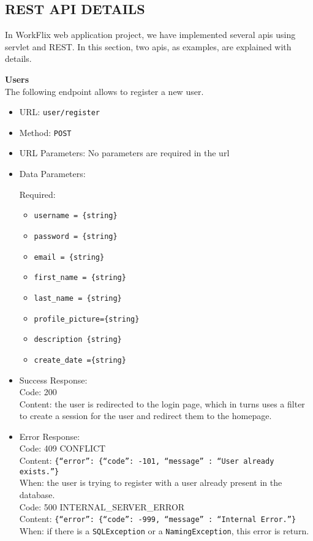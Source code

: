 \subsection{REST API DETAILS}

In WorkFlix web application project, we have implemented several apis using servlet and REST. In this section, two apis, as examples, are explained with details.


\noindent\textbf{Users}\\
The following endpoint allows to register a new user.

\begin{itemize}
    \item URL: \texttt{user/register}
    \item Method: \texttt{POST}
    \item URL Parameters: No parameters are required in the url
    \item Data Parameters:
    
    Required:
    
    \begin{itemize}
        \item \texttt{username = \{string\}}
        \item \texttt{password = \{string\}}
        \item \texttt{email = \{string\}}
        \item \texttt{first\_name = \{string\}}
        \item \texttt{last\_name = \{string\}}
        \item \texttt{profile\_picture=\{string\}}
        \item \texttt{description \{string\}}
        \item \texttt{create\_date =\{string\}}
    \end{itemize}
    
    
    \item Success Response:\\
    
    Code: 200\\
    Content: the user is redirected to the login page, which in turns uses a filter to create a session for the user and redirect them to the homepage.\\

    \item Error Response:\\
    
    Code: 409 CONFLICT\\
    Content: \texttt{\{``error'': \{``code'': -101, ``message'' : ``User already exists.''\}}\\
    When: the user is trying to register with a user already present in the database.\\

    Code: 500 INTERNAL\_SERVER\_ERROR\\
    Content: \texttt{\{``error'': \{``code'': -999, ``message'' : ``Internal Error.''\}}\\
    When: if there is a \texttt{SQLException} or a \texttt{NamingException}, this error is return.\\
    
\end{itemize}


